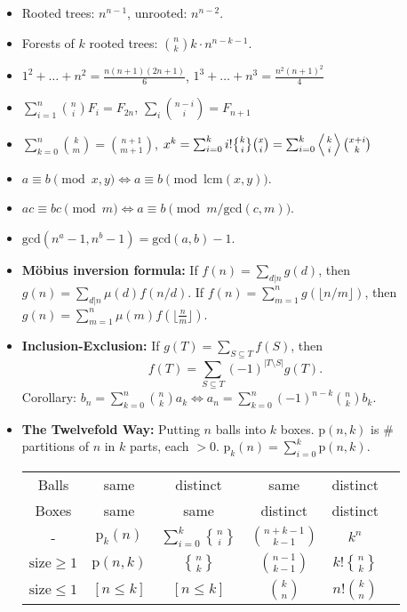 \documentclass[9pt,a4paper,landscape,oneside]{amsart}
\DeclareRobustCommand{\stirling}{\genfrac\{\}{0pt}{}}
\newenvironment{myitemize}
{\begin{itemize}[leftmargin=.3cm]
	\setlength{\itemsep}{0pt}
	\setlength{\parskip}{0pt}
	\setlength{\parsep}{0pt}     }
{ \end{itemize}                  }
\begin{document}
\begin{multicols*}{3}
\begin{myitemize}
	\item Rooted trees: $n^{n-1}$, unrooted: $n^{n-2}$.
	\item Forests of $k$ rooted trees: $\binom{n}{k} k \cdot n^{n-k-1}$.
	\item $1^2 + \dots + n^2 = \frac{n(n+1)(2n+1)}{6}$, \quad $1^3 + \dots + n^3 = \frac{n^2(n+1)^2}{4}$ \\
	\item $\sum_{i=1}^n \binom{n}{i} F_i = F_{2n}$, \quad $\sum_{i} \binom{n-i}{i} = F_{n+1}$
	\item $\sum_{k=0}^n \binom{k}{m} = \binom{n+1}{m+1}$, \quad $x^k = \sum_{i=0}^k i!\stirling{k}{i}\binom{x}{i} = \sum_{i=0}^k \left\langle {k \atop i} \right\rangle\binom{x+i}{k}$
	\item $a\equiv b \pmod{x,y} \Leftrightarrow a \equiv b \pmod{\mathrm{lcm}(x,y)}$.
	\item $ac \equiv bc \pmod{m} \Leftrightarrow a \equiv b \pmod{m/\mathrm{gcd}(c,m)}$.
	\item $\mathrm{gcd}(n^a-1,n^b-1) = \mathrm{gcd}(a,b)-1$.
	\item \textbf{Möbius inversion formula:} If $f(n) = \sum_{d|n} g(d)$, then $g(n) = \sum_{d|n} \mu(d) f(n/d)$. If $f(n) = \sum_{m=1}^n g(\lfloor n/m\rfloor)$, then $g(n) = \sum_{m=1}^n \mu(m)f(\lfloor\frac{n}{m}\rfloor)$.
	\item \textbf{Inclusion-Exclusion:} If $g(T) = \sum_{S \subseteq T} f(S)$, then
	\[
		f(T) = \sum_{S \subseteq T} (-1)^{\lvert T \setminus S \rvert} g(T).
	\]
	Corollary:
		$b_n = \sum_{k=0}^{n} \binom{n}{k} a_k \Longleftrightarrow a_n = \sum_{k=0}^{n} (-1)^{n-k} \binom{n}{k} b_k$.

	\item \textbf{The Twelvefold Way:}
Putting $n$ balls into $k$ boxes.
$\mathrm{p}(n,k)$ is \# partitions of $n$ in $k$ parts, each $>0$.
$\mathrm{p}_k(n) = \sum_{i=0}^k \mathrm{p}(n,k)$.

\begin{tabular}{@{}c|c|c|c|c|l@{}}
	Balls & same & distinct & same & distinct\\
	Boxes & same & same & distinct & distinct\\
	\hline
	- & $\mathrm{p}_k(n)$ & $\sum_{i=0}^k \stirling{n}{i}$ & $\binom{n+k-1}{k-1}$ & $k^n$ \\
	$\mathrm{size}\ge 1$ & $\mathrm{p}(n,k)$ & $\stirling{n}{k}$ & $\binom{n-1}{k-1}$ & $k!\stirling{n}{k}$ \\
	$\mathrm{size}\le 1$ & $[n \le k]$ & $[n \le k]$ & $\binom{k}{n}$ & $n!\binom{k}{n}$ \\
	\bottomrule
\end{tabular}


\end{myitemize}
\end{multicols*}
\end{document}
